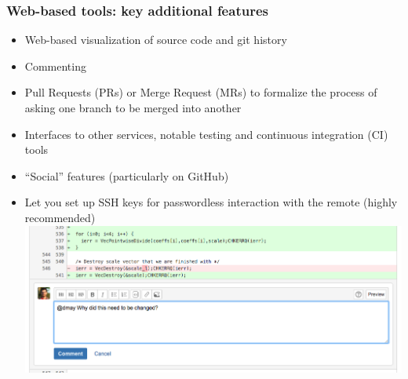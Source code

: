 \begin{frame}[fragile]
\frametitle{Web-based tools: key additional features}
\begin{itemize}
  \item Web-based visualization of source code and git history
  \item Commenting
  \item Pull Requests (PRs) or Merge Request (MRs) to formalize the process of asking one branch to be merged into another
  \item Interfaces to other services, notable testing and continuous integration (CI) tools
  \item ``Social'' features (particularly on GitHub)
  \item Let you set up SSH keys for passwordless interaction with the remote (highly recommended)
\includegraphics[scale=0.3]{bitbucket1}
\end{itemize}
\end{frame}


